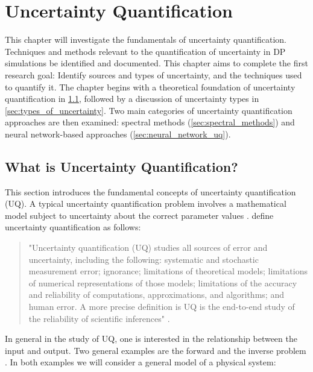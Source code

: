 \chapter{Uncertainty Quantification}
\label{chapter:uncertainty_quantification}
This chapter will investigate the fundamentals of uncertainty quantification. Techniques and methods relevant to the
quantification of uncertainty in DP simulations be identified and documented. This chapter aims to complete the first
research goal: Identify sources and types of uncertainty, and the techniques used to quantify it. The chapter begins
with a theoretical foundation of uncertainty quantification in \cref{sec:uncertainty_quantification_background}, followed by a discussion of
uncertainty types in \cref{sec:types_of_uncertainty}. Two main categories of uncertainty quantification approaches are then examined:
spectral methods (\cref{sec:spectral_methods}) and neural network-based approaches (\cref{sec:neural_network_uq}). 



\section{What is Uncertainty Quantification?}
\label{sec:uncertainty_quantification_background}
This section introduces the fundamental concepts of uncertainty quantification (UQ). A typical uncertainty quantification problem involves a mathematical model subject to
uncertainty about the correct parameter values \parencite{sullivanIntroductionUncertaintyQuantification2015}.
\textcite{higdonUncertaintyQuantificationError2009} define uncertainty quantification as follows:

\begin{quotation}
    "Uncertainty quantification (UQ) studies all sources of error and uncertainty, including the following: systematic
    and stochastic measurement error; ignorance; limitations of theoretical models; limitations of numerical
    representations of those models; limitations of the accuracy and reliability of computations, approximations, and
    algorithms; and human error. A more precise definition is UQ is the end-to-end study of the reliability of
    scientific inferences"
    \parencite{higdonUncertaintyQuantificationError2009}.
\end{quotation}

In general in the study of UQ, one is interested in the relationship between the input and output. Two general examples
are the forward and the inverse problem \parencite{sullivanIntroductionUncertaintyQuantification2015}. In both examples
we will consider a general model of a physical system:

